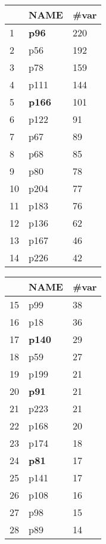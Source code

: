 
\begin{table*}
    \centering
    \begin{tabular}[t]{ l | l l }
        \midrule
        & NAME & \#var  \\
        \hline
       1 & \textbf{p96} & 220  \\
    \hline
    2 & p56 & 192\\
    \hline
    3 & p78 & 159 \\
    \hline
    4 & p111 & 144 \\
    \hline
    5 & \textbf{p166} & 101  \\
    \hline
    6 & p122 & 91  \\
    \hline
    7 & p67 & 89  \\
    \hline
    8 & p68 & 85  \\
    \hline
    9 & p80 & 78 \\
    \hline
    10 & p204 & 77  \\
    \hline
    11 & p183 & 76  \\
    \hline
    12 & p136 & 62 \\
    \hline
    13 & p167 & 46  \\
    \hline
    14 & p226 & 42  \\
    \hline
    \end{tabular}
    \begin{tabular}[t]{l | l l}
    \midrule
    & NAME & \#var  \\
    
    \hline
    15 & p99 & 38  \\
    \hline
    16 & p18 & 36  \\
    \hline
    17 & \textbf{p140} & 29  \\
    \hline
    18 & p59 & 27  \\
    \hline
    19 & p199 & 21 \\
    \hline
    20 & \textbf{p91} & 21 \\
    \hline
    21 & p223 & 21  \\
    \hline
    22 & p168 & 20  \\
    \hline
    23 & p174 & 18 \\
    \hline
    24 & \textbf{p81} & 17  \\
    \hline
    25 & p141 & 17 \\
    \hline
    26 & p108 & 16 \\
    \hline
    27 & p98 & 15  \\
    \hline
    28 & p89 & 14  \\
    \hline
    \end{tabular}
    \begin{tabular}[t]{l | l l}
        

\end{tabular}
\end{table*}
